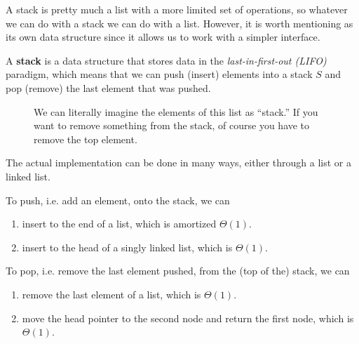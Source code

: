   A stack is pretty much a list with a more limited set of operations, so whatever we can do with a stack we can do with a list. However, it is worth mentioning as its own data structure since it allows us to work with a simpler interface. 

  \begin{definition}[Stack]
    A \textbf{stack} is a data structure that stores data in the \textit{last-in-first-out (LIFO)} paradigm, which means that we can push (insert) elements into a stack $S$ and pop (remove) the last element that was pushed. 

    \begin{figure}[H]
      \centering 
      \caption{We can literally imagine the elements of this list as ``stack.'' If you want to remove something from the stack, of course you have to remove the top element. } 
      \label{fig:stack}
    \end{figure}
  \end{definition} 

  The actual implementation can be done in many ways, either through a list or a linked list. 

  \begin{algo}
    To push, i.e. add an element, onto the stack, we can 
    \begin{enumerate}
      \item insert to the end of a list, which is amortized $\Theta(1)$. 
      \item insert to the head of a singly linked list, which is $\Theta(1)$. 
    \end{enumerate}
  \end{algo}

  \begin{algo}
    To pop, i.e. remove the last element pushed, from the (top of the) stack, we can 
    \begin{enumerate}
      \item remove the last element of a list, which is $\Theta(1)$. 
      \item move the head pointer to the second node and return the first node, which is $\Theta(1)$. 
    \end{enumerate}
  \end{algo}

